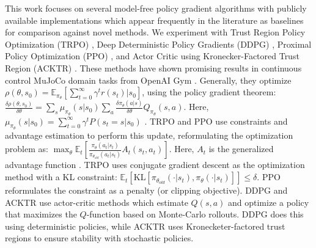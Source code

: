 \documentclass[letterpaper]{article} %
\begin{document}
This work focuses on several model-free policy gradient algorithms with publicly available implementations which appear frequently in the literature as baselines for comparison against novel methods.
We experiment with Trust Region Policy Optimization (TRPO) \cite{TRPO}, Deep Deterministic Policy Gradients (DDPG) \cite{DDPG}, Proximal Policy Optimization (PPO) \cite{PPO}, and Actor Critic using Kronecker-Factored Trust Region (ACKTR) \cite{ACKTR}. These methods have shown promising results in continuous control MuJoCo domain tasks \cite{MuJoCo} from OpenAI Gym \cite{gym}.
Generally, they optimize $\rho (\theta, s_0) = \mathbb{E}_{\pi_\theta}\left[ \sum_{t=0}^\infty \gamma^t r(s_t) | s_0 \right]$, using the policy gradient theorem: $\frac{\delta \rho (\theta, s_0)}{\delta \theta} = \sum_s \mu_{\pi_\theta} (s | s_0) \sum_a \frac{\delta \pi_\theta (a | s)}{\delta \theta} Q_{\pi_\theta} (s,a)$.
Here, $\mu_{\pi_\theta} (s | s_0) = \sum_{t=0}^\infty \gamma^t P(s_t = s | s_0)$ \cite{sutton2000policy}.
TRPO \cite{TRPO} and PPO \cite{PPO} use constraints and advantage estimation to perform this update, reformulating the optimization problem as: $\max_\theta \mathbb{E}_{t} \left[ \frac{\pi_\theta (a_t|s_t)}{\pi_{\theta_{old}}(a_t|s_t)} A_t(s_t, a_t) \right]$. Here, $A_t$ is the generalized advantage function \cite{schulman2015high}.
TRPO uses conjugate gradient descent as the optimization method with a KL constraint: $\mathbb{E}_t \left[\text{KL} \left[ \pi_{\theta_{old}} ( \cdot | s_t), \pi_\theta (\cdot | s_t) \right] \right] \le \delta$. PPO reformulates the constraint as a penalty (or clipping objective). DDPG and ACKTR use actor-critic methods which estimate $Q(s,a)$ and optimize a policy that maximizes the $Q$-function based on Monte-Carlo rollouts. DDPG does this using deterministic policies, while ACKTR uses Kronecketer-factored trust regions to ensure stability with stochastic policies.


\end{document}
